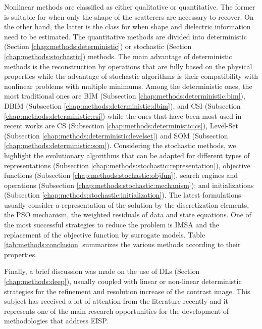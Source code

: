 		Nonlinear methods are classified as either qualitative or quantitative. The former is suitable for when only the shape of the scatterers are necessary to recover. On the other hand, the latter is the class for when shape and dielectric information need to be estimated. The quantitative methods are divided into deterministic (Section \ref{chap:methods:deterministic}) or stochastic (Section \ref{chap:methods:stochastic}) methods. The main advantage of deterministic methods is the reconstruction by operations that are fully based on the physical properties while the advantage of stochastic algorithms is their compatibility with nonlinear problems with multiple minimums. Among the deterministic ones, the most traditional ones are BIM (Subsection \ref{chap:methods:deterministic:bim}), DBIM (Subsection \ref{chap:methods:deterministic:dbim}), and CSI (Subsection \ref{chap:methods:deterministic:csi}) while the ones that have been most used in recent works are CS (Subsection \ref{chap:methods:deterministic:cs}), Level-Set (Subsection \ref{chap:methods:deterministic:levelset}) and SOM (Subsection \ref{chap:methods:deterministic:som}). Considering the stochastic methods, we highlight the evolutionary algorithms that can be adapted for different types of representations (Subsection \ref{chap:methods:stochastic:representation}), objective functions (Subsection \ref{chap:methods:stochastic:objfun}), search engines and operations (Subsection \ref{chap:methods:stochastic:mechanism}); and initializations (Subsection \ref{chap:methods:stochastic:initialization}). The latest formulations usually consider a representation of the solution by the discretization elements, the PSO mechanism, the weighted residuals of data and state equations. One of the most successful strategies to reduce the problem is IMSA and the replacement of the objective function by surrogate models. Table \ref{tab:methods:conclusion} summarizes the various methods according to their properties.
		
		Finally, a brief discussion was made on the use of DLs (Section \ref{chap:methods:deep}), usually coupled with linear or non-linear deterministic strategies for the refinement and resolution increase of the contrast image. This subject has received a lot of attention from the literature recently and it represents one of the main research opportunities for the development of methodologies that address EISP.
		
